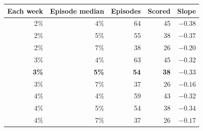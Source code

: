 \begin{tabular}{@{}rrrrr@{}}
\toprule
Each week & Episode median & Episodes & Scored & Slope \\
\midrule
2\% & 4\% & 64 & 45 & $-0.38$ \\
2\% & 5\% & 55 & 38 & $-0.37$ \\
2\% & 7\% & 38 & 26 & $-0.20$ \\
3\% & 4\% & 63 & 45 & $-0.32$ \\
\textbf{3\%} & \textbf{5\%} & \textbf{54} & \textbf{38} & \textbf{$-0.33$} \\
3\% & 7\% & 37 & 26 & $-0.16$ \\
4\% & 4\% & 59 & 43 & $-0.32$ \\
4\% & 5\% & 54 & 38 & $-0.34$ \\
4\% & 7\% & 37 & 26 & $-0.17$ \\
\bottomrule
\end{tabular}
